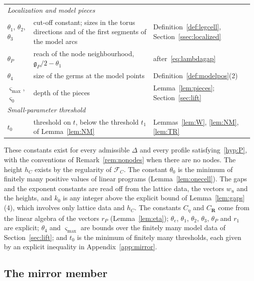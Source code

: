 \begin{center}
\begin{tabular}{p{2.4cm}p{7.4cm}p{4.6cm}}
\multicolumn{3}{l}{\emph{Localization and model pieces}}\\
$\theta_1$, $\theta_2$, $\theta_3$ & cut-off constant; sizes in the torus directions and of the first segments of the
model arcs & Definition~\ref{def:legcell}, Section~\ref{ssec:localized}\\
$\theta_P$ & reach of the node neighbourhood, $\mathfrak g_P/2-\theta_1$ & after~\eqref{eq:lambdagap}\\
$\theta_4$ & size of the germs at the model points & Definition~\ref{def:modelpos}(2)\\
$\varsigma_{\max}$, $\varsigma_0$ & depth of the pieces & Lemma~\ref{lem:pieces}; Section~\ref{sec:lift}\\
\multicolumn{3}{l}{\emph{Small-parameter threshold}}\\
$t_0$ & threshold on $t$, below the threshold $t_1$ of Lemma~\ref{lem:NM} & Lemmas~\ref{lem:W}, \ref{lem:NM}, \ref{lem:TR}
\end{tabular}
\end{center}
These constants exist for every admissible $\Delta$ and every profile satisfying~\ref{hyp:P},
with the conventions of Remark~\ref{rem:nonodes} when there are no nodes. The height $h_C$ exists by the regularity of $\mathcal F_C$. The constant
$\theta_0$ is the minimum of finitely many positive values of linear programs (Lemma~\ref{lem:onecell}). The gaps and
the exponent constants are read off from the lattice data, the vectors $w_u$ and the heights, and $k_0$ is any integer
above the explicit bound of Lemma~\ref{lem:gaps}(4), which involves only lattice data and $h_C$. The constants $C_\eta$
and $C_{\mathbf R}$ come from the linear algebra of the vectors $r_P$ (Lemma~\ref{lem:eta}); $\theta_e$, $\theta_1$, $\theta_2$,
$\theta_3$, $\theta_P$ and $r_1$ are explicit; $\theta_4$ and $\varsigma_{\max}$ are bounds over the finitely many
model data of Section~\ref{sec:lift}; and $t_0$ is the minimum of finitely
many thresholds, each given by an explicit inequality in Appendix~\ref{app:mirror}.
\subsection{The mirror member}\label{ssec:member}

